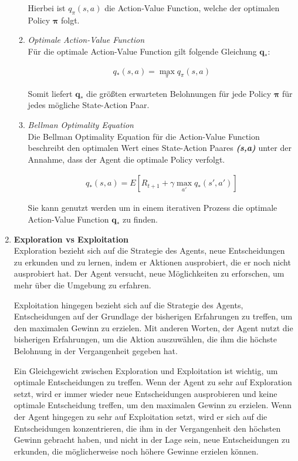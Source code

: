\begin{enumerate}
\begin{enumerate}
        Hierbei ist $q_{\pi}(s,a)$ die Action-Value Function, welche der optimalen Policy {$\bm{\pi}$} folgt.

        \item \textit{Optimale Action-Value Function}\\
        Für die optimale Action-Value Function gilt folgende Gleichung $\bm{q_{*}}$:

        \begin{align}
            q_{*}(s,a)=\max_{\pi}q_{\pi}(s,a)
        \end{align}
    
        Somit liefert $\bm{q_{*}}$ die größten erwarteten Belohnungen für jede Policy {$\bm{\pi}$} für jedes mögliche State-Action Paar.


        \item \textit{Bellman Optimality Equation}\\
        Die Bellman Optimality Equation für die Action-Value Function beschreibt den optimalen Wert eines State-Action Paares \textbf{\textit{(s,a)}} unter der Annahme, dass der Agent die optimale Policy verfolgt.

        \begin{align}
        q_{*}(s,a)=E[R_{t+1}+\gamma \max_{a'} q_{*}(s', a')]
        \end{align}

        Sie kann genutzt werden um in einem iterativen Prozess die optimale Action-Value Function $\bm{q_{*}}$ zu finden.
    \end{enumerate}

    
    \item \textbf{Exploration vs Exploitation}\\
    Exploration bezieht sich auf die Strategie des Agents, neue Entscheidungen zu erkunden und zu lernen, indem er Aktionen ausprobiert, die er noch nicht ausprobiert hat. Der Agent versucht, neue Möglichkeiten zu erforschen, um mehr über die Umgebung zu erfahren.

    Exploitation hingegen bezieht sich auf die Strategie des Agents, Entscheidungen auf der Grundlage der bisherigen Erfahrungen zu treffen, um den maximalen Gewinn zu erzielen. Mit anderen Worten, der Agent nutzt die bisherigen Erfahrungen, um die Aktion auszuwählen, die ihm die höchste Belohnung in der Vergangenheit gegeben hat.
    
    Ein Gleichgewicht zwischen Exploration und Exploitation ist wichtig, um optimale Entscheidungen zu treffen. Wenn der Agent zu sehr auf Exploration setzt, wird er immer wieder neue Entscheidungen ausprobieren und keine optimale Entscheidung treffen, um den maximalen Gewinn zu erzielen. Wenn der Agent hingegen zu sehr auf Exploitation setzt, wird er sich auf die Entscheidungen konzentrieren, die ihm in der Vergangenheit den höchsten Gewinn gebracht haben, und nicht in der Lage sein, neue Entscheidungen zu erkunden, die möglicherweise noch höhere Gewinne erzielen können.
    

\end{enumerate}
